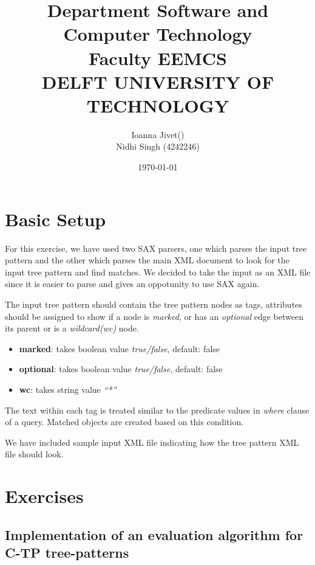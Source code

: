 \documentclass[a4paper,10pt]{article}
\begin{document}
\title{\flushleft\small{Department Software and Computer Technology\\ 
Faculty EEMCS\\
DELFT UNIVERSITY OF TECHNOLOGY\\}
}
\author{Ioanna Jivet() \\
Nidhi Singh (4242246)}
        
\date{\today}
    
\maketitle

\section{Basic Setup}

For this exercise, we have used two SAX parsers, one which parses the input tree pattern and the other which parses the main XML document
to look for the input tree pattern and find matches. We decided to take the input as an XML file since it is easier to parse and gives an oppotunity 
to use SAX again.

The input tree pattern should contain the tree pattern nodes as tags, attributes should be assigned to show if a node is \emph{marked}, or has an 
\emph{optional} edge between its parent or is a \emph{wildcard(wc)} node.
\begin{itemize}
  \item \textbf{marked}: takes boolean value \emph{true/false}, default: false
  \item \textbf{optional}: takes boolean value \emph{true/false}, default: false
  \item \textbf{wc}: takes string value \emph{``*''}
\end{itemize}
The text within each tag is treated similar to the predicate values in \emph{where} clause of a query. Matched objects are created based on this condition.

We have included sample input XML file indicating how the tree pattern XML file should look. 
\section{Exercises}
\subsection{Implementation of an evaluation algorithm for C-TP tree-patterns}
\end{document}
